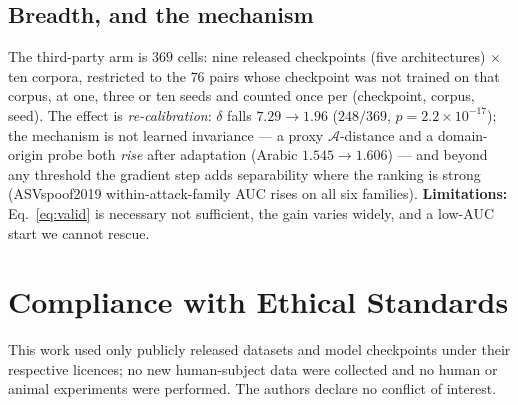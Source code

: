 \documentclass[conference]{IEEEtran}
\begin{document}
\subsection{Breadth, and the mechanism}
The third-party arm is $369$ cells: nine released checkpoints (five
architectures) $\times$ ten corpora, restricted to the $76$ pairs whose checkpoint
was not trained on that corpus, at one, three or ten seeds and counted once per
(checkpoint, corpus, seed). The effect is \emph{re-calibration}: $\delta$ falls
$7.29\!\to\!1.96$ ($248/369$, $p{=}2.2{\times}10^{-17}$); the mechanism is not learned invariance --- a proxy
$\mathcal{A}$-distance and a domain-origin probe both \emph{rise} after adaptation
(Arabic $1.545\!\to\!1.606$) --- and beyond any threshold the gradient step adds
separability where the ranking is strong (ASVspoof2019 within-attack-family AUC
rises on all six families). \textbf{Limitations:} Eq.~\eqref{eq:valid} is
necessary not sufficient, the gain varies widely, and a low-AUC start we cannot
rescue.

\section*{Compliance with Ethical Standards}
This work used only publicly released datasets and model checkpoints under their
respective licences; no new human-subject data were collected and no human or
animal experiments were performed. The authors declare no conflict of interest.
\end{document}
